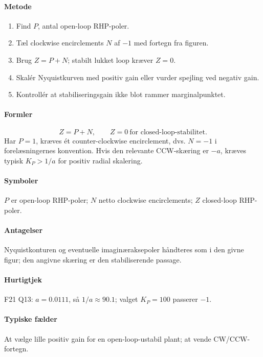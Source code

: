 \paragraph{Metode}
\begin{enumerate}
\item Find \(P\), antal open-loop RHP-poler.
\item Tæl clockwise encirclements \(N\) af \(-1\) med fortegn fra figuren.
\item Brug \(Z=P+N\); stabilt lukket loop kræver \(Z=0\).
\item Skalér Nyquistkurven med positiv gain eller vurder spejling ved negativ gain.
\item Kontrollér at stabiliseringsgain ikke blot rammer marginalpunktet.
\end{enumerate}

\paragraph{Formler}
\[
Z=P+N,\qquad Z=0\ \text{for closed-loop-stabilitet.}
\]
Har \(P=1\), kræves ét counter-clockwise encirclement, dvs. \(N=-1\) i
forelæsningernes konvention. Hvis den relevante CCW-skæring er \(-a\), kræves
typisk \(K_P>1/a\) for positiv radial skalering.

\paragraph{Symboler}
\(P\) er open-loop RHP-poler; \(N\) netto clockwise encirclements; \(Z\) closed-loop
RHP-poler.

\paragraph{Antagelser}
Nyquistkonturen og eventuelle imaginæraksepoler håndteres som i den givne figur;
den angivne skæring er den stabiliserende passage.

\paragraph{Hurtigtjek}
F21 Q13: \(a=0.0111\), så \(1/a\approx90.1\); valget \(K_P=100\) passerer \(-1\).

\paragraph{Typiske fælder}
At vælge lille positiv gain for en open-loop-ustabil plant; at vende CW/CCW-fortegn.

